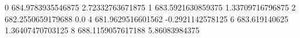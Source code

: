 0 684.9783935546875 2.72332763671875
1 683.5921630859375 1.33709716796875
2 682.2550659179688 0.0
4 681.9629516601562 -0.2921142578125
6 683.619140625 1.36407470703125
8 688.1159057617188 5.86083984375
